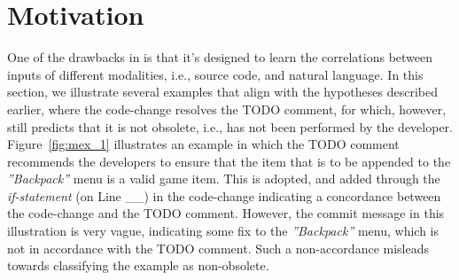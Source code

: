 
\section{Motivation}
\label{intro:sec}

One of the drawbacks in \tdcleaner is that it's designed to learn
the correlations between inputs of different modalities, i.e., source 
code, and natural language. In this section, we illustrate several 
examples that align with the hypotheses described earlier, where
the  code-change resolves the TODO comment, for which, however, 
\tdcleaner still predicts that it is not obsolete, i.e., has not been 
performed by the developer. Figure~\ref{fig:mex_1} illustrates an 
example in which the TODO comment recommends the developers to ensure that 
the item that is to be appended to the {\em''Backpack''} menu is a valid 
game item. This is adopted, and added through the {\em if-statement} 
(on Line \_\_) in the code-change indicating a concordance between 
the code-change  and the TODO comment. However, the commit 
message in this illustration is very vague, indicating some fix to 
the {\em''Backpack''} menu, which is not in accordance with the TODO 
comment. Such  a non-accordance misleads \tdcleaner towards 
classifying the example as non-obsolete. 

